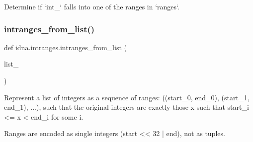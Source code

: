 \begin{DoxyVerb}Determine if `int_` falls into one of the ranges in `ranges`.\end{DoxyVerb}
 \mbox{\label{namespaceidna_1_1intranges_afe9a6330ae836d03ecd3d9459adfabde}} 
\subsubsection{\texorpdfstring{intranges\+\_\+from\+\_\+list()}{intranges\_from\_list()}}
{\footnotesize\ttfamily def idna.\+intranges.\+intranges\+\_\+from\+\_\+list (\begin{DoxyParamCaption}\item[{}]{list\+\_\+ }\end{DoxyParamCaption})}

\begin{DoxyVerb}Represent a list of integers as a sequence of ranges:
((start_0, end_0), (start_1, end_1), ...), such that the original
integers are exactly those x such that start_i <= x < end_i for some i.

Ranges are encoded as single integers (start << 32 | end), not as tuples.
\end{DoxyVerb}
 